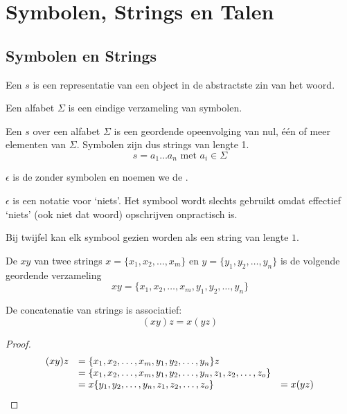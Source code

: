 \documentclass[main.tex]{subfiles}
\begin{document}
\chapter{Symbolen, Strings en Talen}
\label{cha:symbolen-strings-talen}

\section{Symbolen en Strings}
\label{sec:symbolen-en-strings}

\begin{de}
  Een  $s$ is een representatie van een object in de abstractste zin van het woord. 
\end{de}

\begin{de}
  Een alfabet $\Sigma$ is een eindige verzameling van symbolen.
\end{de}

\begin{de}
  Een  $s$ over een alfabet $\Sigma$ is een geordende opeenvolging van nul, \'e\'en of meer elementen van $\Sigma$. Symbolen zijn dus strings van lengte 1.
  \[ s = a_{1}\ldots a_{n} \text{ met } a_{i} \in \Sigma \]
\end{de}

\begin{de}
  $\epsilon$ is de  zonder symbolen en noemen we de .
\end{de}

\begin{opm}
  $\epsilon$ is een notatie voor `niets'. Het symbool wordt slechts gebruikt omdat effectief `niets' (ook niet dat woord) opschrijven onpractisch is.
\end{opm}

\begin{opm}
  Bij twijfel kan elk symbool gezien worden als een string van lengte $1$.
\end{opm}

\begin{de}
  De  $xy$ van twee strings $x = \{x_1,x_2,\ldots,x_m\}$ en $y =   \{y_1,y_2,\ldots,y_n\}$ is de volgende geordende verzameling  
  \[
  xy = \{ x_1,x_2,\ldots,x_m,y_1,y_2,\ldots,y_n\}
  \] 
\end{de}

\begin{ei}
  De concatenatie van strings is associatief:
  \[
  (xy)z = x(yz)
  \]

  \begin{proof}
    \[
    \begin{array}{r l l}
      (xy)z &= \{x_1,x_2,\ldots,x_m,y_1,y_2,\ldots,y_n\}z &\\
            &= \{x_1,x_2,\ldots,x_m,y_1,y_2,\ldots,y_n,z_1,z_2,\ldots,z_o\} &\\
            &= x\{y_1,y_2,\ldots,y_n,z_1,z_2,\ldots,z_o\} &= x(yz)
    \end{array}
    \]
  \end{proof}
\end{ei}
\end{document}
